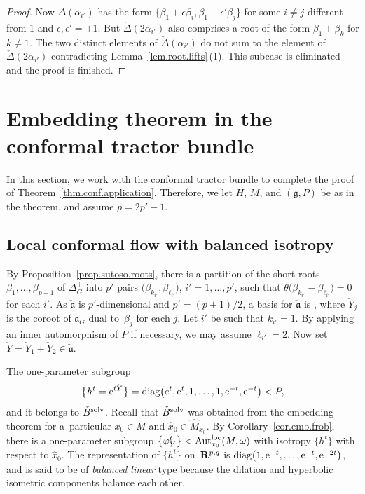 \documentclass[10pt,a4paper]{amsart}
\numberwithin{equation}{section}
\theoremstyle{definition}
\newcommand{\BR}{{\bf R}}
\newcommand{\lieg}{\mathfrak{g}}
\def\a{{\mathfrak a}}
\newcommand{\Aut}{\operatorname{Aut}}
\begin{document}
\begin{proof}
Now $ \check{\Delta}(\alpha_{i'})$ has the form $\{ \beta_1 +\epsilon \beta_i, \beta_1 + \epsilon' \beta_j \}$ for some $i \neq j$ different from $1$ and $\epsilon, \epsilon' = \pm 1$. But $\check{\Delta}(2\alpha_{i'})$ also comprises a root of the form $\beta_1 \pm \beta_k$ for $k \neq 1$.
 The two distinct elements of $\check{\Delta}(\alpha_{i'})$ do not sum to the element of $\check{\Delta}(2\alpha_{i'})$
contradicting Lemma~\ref{lem.root.lifts}\,(1). This subcase is eliminated and the proof is finished.
\end{proof}

\section{Embedding theorem in the conformal tractor bundle}

In this section, we work with the conformal tractor bundle to complete the proof of Theorem~\ref{thm.conf.application}.
Therefore, we let $H$, $M$, and $(\lieg,P)$ be as in the theorem, and assume $p = 2p'-1$.

\subsection{Local conformal flow with balanced isotropy}

By Proposition~\ref{prop.sutoso.roots}, there is a partition of the short roots $\beta_1, \dots, \beta_{p+1}$ of $\Delta_G^+$ into $p'$ pairs $\bigl(\beta_{k_{i'}}, \beta_{\ell_{i'}}\bigr)$, $i' = 1, \dots, p'$, such that $\theta\bigl(\beta_{k_{i'}} - \beta_{\ell_{i'}}\bigr) = 0$ for each $i'$. As $\check{\a}$ is $p'$-dimensional and $p' = (p+1)/2$, a basis for $\check{\a}$ is , where $\check{Y}_j$ is the coroot of $\a_G$ dual to~$\beta_j$ for each $j$. Let $i'$ be such that $k_{i'} = 1$. By applying an inner automorphism of $P$ if necessary, we may assume $\ell_{i'} = 2$. Now set $\check{Y} = \check{Y}_1 + \check{Y}_2 \in \check{\a}$.

The one-parameter subgroup
\[\big\{ h^t = {\rm e}^{t \check{Y}} \big\} = {\rm diag}\bigl(e^{t}, {\rm e}^{t}, 1, \dots, 1, {\rm e}^{-t}, {\rm e}^{-t}\bigr) < P,\]
and it belongs to $\check{B}^{\rm solv}$. Recall that $\check{B}^{\rm solv}$ was obtained from the embedding theorem for a~particular $x_0 \in M$ and $\hat{x}_0 \in \hat{M}_{x_0}$. By Corollary~\ref{cor.emb.frob}, there is a one-parameter subgroup ${\bigl\{ \varphi^t_Y \bigr\} < \Aut^{\rm loc}_{x_0}(M,\omega)}$ with isotropy $\bigl\{ h^t \bigr\}$ with respect to $\hat{x}_0$.
The representation of $\bigl\{ h^t \bigr\}$ on~$\BR^{p,q}$ is ${\rm diag}\bigl(1, {\rm e}^{-t}, \dots, {\rm e}^{-t}, {\rm e}^{-2t}\bigr)$, and is said to be of \emph{balanced linear} type because the dilation and hyperbolic isometric components balance each other.
\end{document}
